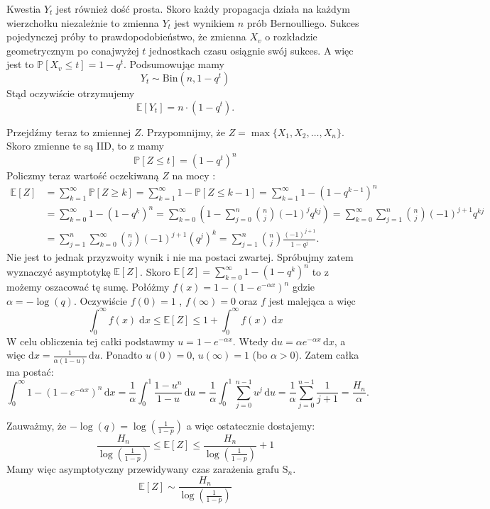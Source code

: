 Kwestia $Y_t$ jest również dość prosta. Skoro każdy propagacja działa na każdym wierzchołku niezależnie to zmienna $Y_t$ jest wynikiem $n$ prób Bernoulliego. Sukces pojedynczej próby to prawdopodobieństwo, że zmienna $X_v$ o rozkładzie geometrycznym po conajwyżej $t$ jednostkach czasu osiągnie swój sukces. A więc jest to $\mathbb{P}[X_v\le t]=1-q^t$. Podsumowując mamy
\[
    Y_t \sim \mathrm{Bin}(n, 1-q^t)
\]
Stąd oczywiście otrzymujemy 
\[
    \mathbb{E}[Y_t] = n\cdot (1-q^t). 
\]

Przejdźmy teraz to zmiennej $Z$. Przypomnijmy, że $Z=\max\{X_1,X_2,\dots,X_n\}$. Skoro zmienne te są IID, to z  mamy 
\[
    \mathbb{P}[Z\le t] = (1-q^t)^n
\]
Policzmy teraz wartość oczekiwaną $Z$ na mocy :
\begin{align*}
\mathbb{E}[Z] 
&= \sum_{k=1}^{\infty} \mathbb{P}[Z\ge k] 
 = \sum_{k=1}^{\infty} 1 - \mathbb{P}[Z\le k-1]
 = \sum_{k=1}^{\infty}  1 - (1-q^{k-1})^n  \\
&= \sum_{k=0}^{\infty}  1 - (1-q^k)^n 
 = \sum_{k=0}^{\infty} \left( 1 - \sum_{j=0}^{n} \binom{n}{j} (-1)^j q^{kj} \right) 
 = \sum_{k=0}^{\infty} \sum_{j=1}^{n} \binom{n}{j} (-1)^{j+1} q^{kj} \\
&= \sum_{j=1}^{n} \sum_{k=0}^{\infty} \binom{n}{j} (-1)^{j+1} (q^j)^k 
 = \sum_{j=1}^{n} \binom{n}{j} \frac{(-1)^{j+1}}{1-q^j}.
\end{align*}
Nie jest to jednak przyzwoity wynik i nie ma postaci zwartej. Spróbujmy zatem wyznaczyć asymptotykę $\mathbb{E}[Z]$. Skoro $\mathbb{E}[Z] = \sum_{k=0}^{\infty}  1 - (1-q^k)^n$ to z  możemy oszacować tę sumę. Połóżmy $f(x) = 1 - (1 - e^{-\alpha x})^n$ gdzie $\alpha = -\log(q)$. Oczywiście $f(0)=1$ , $f(\infty)=0$ oraz $f$ jest malejąca a więc
\[
    \int_{0}^{\infty} f(x) \; \mathrm{d}x \le \mathbb{E}[Z] \le  1 + \int_{0}^{\infty} f(x) \; \mathrm{d}x
\]
W celu obliczenia tej całki podstawmy $u = 1 - e^{-\alpha x}$. 
Wtedy $\mathrm{d}u = \alpha e^{-\alpha x} \, \mathrm{d}x$, 
a więc $\mathrm{d}x = \frac{1}{\alpha(1-u)} \, \mathrm{d}u$. 
Ponadto $u(0) = 0$, $u(\infty) = 1$ (bo $\alpha > 0$). 
Zatem całka ma postać:
\[
\int_{0}^{\infty} 1 - (1 - e^{-\alpha x})^n \, \mathrm{d}x
= \frac{1}{\alpha} \int_{0}^{1} \frac{1 - u^n}{1 - u} \, \mathrm{d}u
= \frac{1}{\alpha} \int_{0}^{1} \sum_{j=0}^{n-1} u^j \, \mathrm{d}u
= \frac{1}{\alpha} \sum_{j=0}^{n-1} \frac{1}{j+1}
= \frac{H_n}{\alpha}.
\]

Zauważmy, że $-\log(q)=\log(\frac{1}{1-p})$ a więc ostatecznie dostajemy:
\[
    \frac{H_n}{\log(\frac{1}{1-p})} \le \mathbb{E}[Z] \le \frac{H_n}{\log(\frac{1}{1-p})} + 1
\]
Mamy więc asymptotyczny przewidywany czas zarażenia grafu $\mathrm{S}_n$.
\[
    \mathbb{E}[Z] \sim \frac{H_n}{\log(\frac{1}{1-p})}
\]

